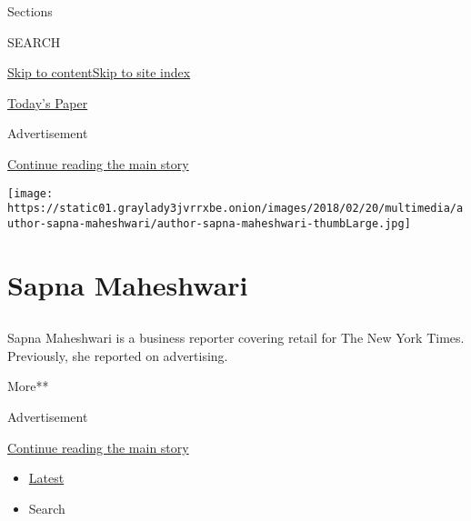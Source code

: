 Sections

SEARCH

\protect\hyperlink{site-content}{Skip to
content}\protect\hyperlink{site-index}{Skip to site index}

\href{https://myaccount.nytimes3xbfgragh.onion/auth/login?response_type=cookie\&client_id=vi}{}

\href{https://www.nytimes3xbfgragh.onion/section/todayspaper}{Today's
Paper}

Advertisement

\protect\hyperlink{after-top}{Continue reading the main story}

\texttt{[image: https://static01.graylady3jvrrxbe.onion/images/2018/02/20/multimedia/author-sapna-maheshwari/author-sapna-maheshwari-thumbLarge.jpg]}

\hypertarget{sapna-maheshwari}{%
\section{Sapna Maheshwari}\label{sapna-maheshwari}}

\subsection{}

Sapna Maheshwari is a business reporter covering retail for The New York
Times. Previously, she reported on advertising.~

More**

Advertisement

\protect\hyperlink{after-mid1}{Continue reading the main story}

\begin{itemize}
\tightlist
\item
  \protect\hyperlink{stream-panel}{Latest}
\item
  Search
\end{itemize}

